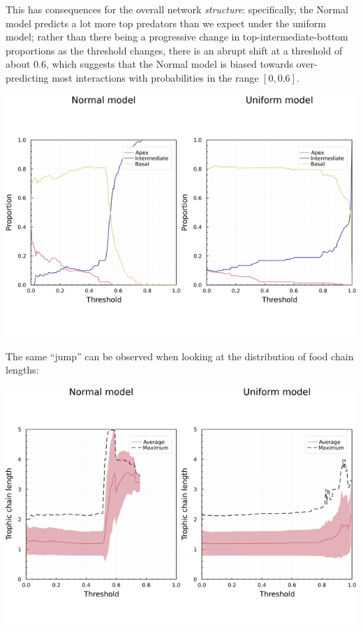 This has consequences for the overall network \emph{structure}:
specifically, the Normal model predicts a lot more top predators than we
expect under the uniform model; rather than there being a progressive
change in top-intermediate-bottom proportions as the threshold changes,
there is an abrupt shift at a threshold of about 0.6, which suggests
that the Normal model is biased towards over-predicting most
interactions with probabilities in the range \([0,0.6]\).

\includegraphics[width=\textwidth]{./figures/supplementary/comparison_tib.png}

The same ``jump'' can be observed when looking at the distribution of
food chain lengths:

\includegraphics[width=\textwidth]{./figures/supplementary/comparison_rophicchain.png}

